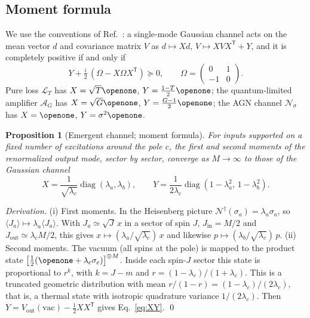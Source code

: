 \documentclass[aps,pra,reprint,superscriptaddress,nofootinbib,longbibliography,floatfix]{revtex4-2}
\newtheorem{proposition}{Proposition}
\theoremstyle{remark}
\newcommand{\diag}{\operatorname{diag}}
\newcommand{\one}{\openone}
\newcommand{\Nsig}{\mathcal{N}_\sigma}
\newcommand{\Amp}{\mathcal{A}}
\newcommand{\Loss}{\mathcal{L}}
\begin{document}
\subsection{Moment formula}
We use the conventions of Ref.~\cite{holevo2007onemode}: a single-mode Gaussian channel acts on the
mean vector $d$ and covariance matrix $V$ as $d\mapsto Xd$, $V\mapsto XVX^{\mathsf T}+Y$, and it is
completely positive if and only if
\begin{equation}
  Y+\tfrac i2\,(\Omega-X\Omega X^{\mathsf T})\succeq0,\qquad \Omega=\begin{pmatrix}0&1\\-1&0\end{pmatrix}.
  \label{eq:cp}
\end{equation}
Pure loss $\Loss_T$ has $X=\sqrt T\one$, $Y=\frac{1-T}2\one$; the quantum-limited amplifier $\Amp_G$ has
$X=\sqrt G\one$, $Y=\frac{G-1}2\one$; the AGN channel $\Nsig$ has $X=\one$, $Y=\sigma^2\one$.

\begin{proposition}[Emergent channel; moment formula]
\label{prop:emergent}
For inputs supported on a fixed number of excitations around the pole $c$, the first and second moments
of the renormalized output mode, sector by sector, converge as $M\to\infty$ to those of the Gaussian
channel
\begin{equation}
  X=\frac{1}{\sqrt{\lambda_c}}\diag(\lambda_a,\lambda_b),\qquad
  Y=\frac{1}{2\lambda_c}\diag(1-\lambda_a^2,\,1-\lambda_b^2).
  \label{eq:XY}
\end{equation}
\end{proposition}

\textit{Derivation.} (i) First moments. In the Heisenberg picture $\mathcal N^\dagger(\sigma_a)=\lambda_a\sigma_a$,
so $\langle J_a\rangle\mapsto\lambda_a\langle J_a\rangle$. With $J_a\simeq\sqrt{J}\,x$ in a sector of
spin $J$, $J_{\mathrm{in}}=M/2$ and $J_{\mathrm{out}}\simeq\lambda_cM/2$, this gives
$x\mapsto(\lambda_a/\sqrt{\lambda_c})\,x$ and likewise $p\mapsto(\lambda_b/\sqrt{\lambda_c})\,p$.
(ii) Second moments. The vacuum (all spins at the pole) is mapped to the product state
$\bigl[\tfrac12(\one+\lambda_c\sigma_c)\bigr]^{\otimes M}$. Inside each spin-$J$ sector this state is
proportional to $r^{k}$, with $k=J-m$ and $r=(1-\lambda_c)/(1+\lambda_c)$. This is a truncated geometric
distribution with mean $r/(1-r)=(1-\lambda_c)/(2\lambda_c)$, that is, a thermal state with isotropic
quadrature variance $1/(2\lambda_c)$. Then $Y=V_{\mathrm{out}}(\text{vac})-\tfrac12XX^{\mathsf T}$ gives
Eq.~\eqref{eq:XY}. \qed
\end{document}
